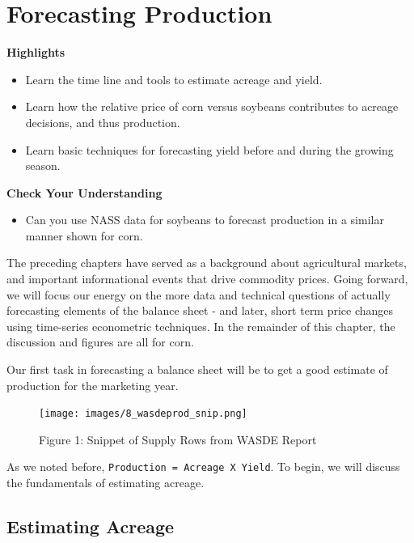 \documentclass[
]{book}
\providecommand{\tightlist}{%
  \setlength{\itemsep}{0pt}\setlength{\parskip}{0pt}}
\begin{document}
\hypertarget{forecasting-production}{%
\chapter{Forecasting Production}\label{forecasting-production}}

\textbf{Highlights}

\begin{itemize}
\tightlist
\item
  Learn the time line and tools to estimate acreage and yield.
\item
  Learn how the relative price of corn versus soybeans contributes to acreage decisions, and thus production.
\item
  Learn basic techniques for forecasting yield before and during the growing season.
\end{itemize}

\textbf{Check Your Understanding}

\begin{itemize}
\tightlist
\item
  Can you use NASS data for soybeans to forecast production in a similar manner shown for corn.
\end{itemize}

The preceding chapters have served as a background about agricultural markets, and important informational events that drive commodity prices. Going forward, we will focus our energy on the more data and technical questions of actually forecasting elements of the balance sheet - and later, short term price changes using time-series econometric techniques. In the remainder of this chapter, the discussion and figures are all for corn.

Our first task in forecasting a balance sheet will be to get a good estimate of production for the marketing year.

\begin{figure}
\centering
\texttt{[image: images/8\_wasdeprod\_snip.png]}
\caption{Figure 1: Snippet of Supply Rows from WASDE Report}
\end{figure}

As we noted before, \texttt{Production\ =\ Acreage\ X\ Yield}. To begin, we will discuss the fundamentals of estimating acreage.

\hypertarget{estimating-acreage}{%
\section{Estimating Acreage}\label{estimating-acreage}}
\end{document}
